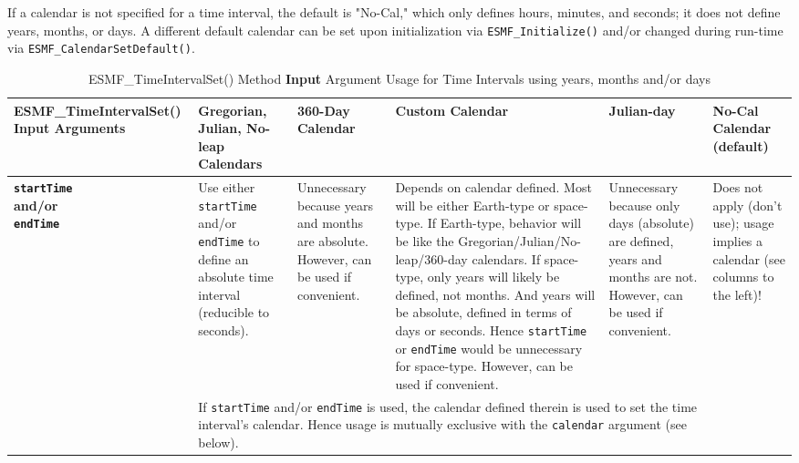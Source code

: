 If a calendar is not specified for a time interval, the default is "No-Cal," which only defines hours, minutes, and seconds; it does not define years, months, or days.  A different default calendar can be set upon initialization via {\tt ESMF\_Initialize()} and/or changed during run-time via {\tt ESMF\_CalendarSetDefault()}.
\begin{center}
\begin{table}

\caption{\label{table:timeIntervalSet}ESMF\_TimeIntervalSet() Method {\bf Input} Argument Usage for Time Intervals using years, months and/or days}

\begin{tabular}{|p{1.15in}|p{1.15in}|p{1.15in}|p{1.15in}|p{1.15in}|p{1.15in}|}
\hline

{\bf ESMF\_TimeIntervalSet() Input Arguments} &
  {\bf Gregorian, Julian, No-leap Calendars} &
  {\bf 360-Day Calendar} &
  {\bf Custom Calendar} &
  {\bf Julian-day} &
  {\bf No-Cal Calendar} (default) \\
\hline\hline

{\bf {\tt startTime} \newline
     and/or \newline
     {\tt endTime}} &

  Use either {\tt startTime} and/or {\tt endTime} to define an absolute time interval (reducible to seconds). &

  Unnecessary because years and months are absolute.  However, can be used if convenient. &

  Depends on calendar defined.  Most will be either Earth-type or space-type.  If Earth-type, behavior will be like the Gregorian/Julian/No-leap/360-day calendars.  If space-type, only years will likely be defined, not months.  And years will be absolute, defined in terms of days or seconds.  Hence {\tt startTime} or {\tt endTime} would be unnecessary for space-type.  However, can be used if convenient. &

  Unnecessary because only days (absolute) are defined, years and months are not.  However, can be used if convenient. &

  Does not apply (don't use); usage implies a calendar (see columns to the left)! \\
\cline{2-5}

  & \multicolumn{4}{l}{If {\tt startTime} and/or {\tt endTime} is used, the calendar defined therein is used to set the time interval's calendar.  Hence usage is mutually exclusive with the {\tt calendar} argument (see below).} \\
\hline


\end{tabular}
\end{table}
\end{center}
